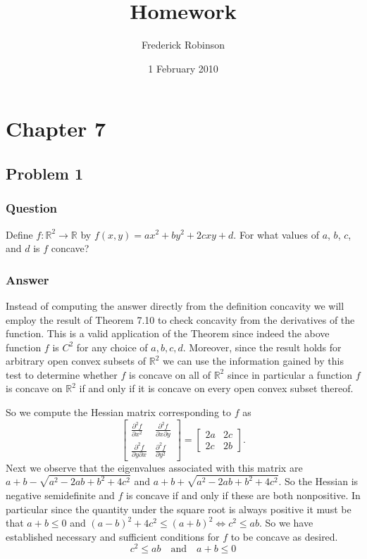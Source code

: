 \documentclass[12pt]{article}
\title{Homework}
\author{Frederick Robinson}
\date{1 February 2010}
\begin{document}

   \maketitle

\setcounter{tocdepth}{2} 

\tableofcontents

\section{Chapter 7}
\subsection{Problem 1}
\subsubsection{Question}
Define $f:\mathbb{R}^2 \to \mathbb{R}$ by $f(x,y) = a x^2 + b y^2 + 2 c x y + d$. For what values of $a$, $b$, $c$, and $d$ is $f$ concave? 
\subsubsection{Answer}
Instead of computing the answer directly from the definition concavity we will employ the result of Theorem 7.10 to check concavity from the derivatives of the function. This is a valid application of the Theorem since indeed the above function $f$ is $C^2$ for any choice of $a, b, c, d$.  Moreover, since the result holds for arbitrary open convex subsets of $\mathbb{R}^2$ we can use the information gained by this test to determine whether $f$ is concave on all of $\mathbb{R}^2$ since in particular a function $f$ is concave on $\mathbb{R}^2$ if and only if it is concave on every open convex subset thereof. 

So we compute the Hessian matrix corresponding to $f$ as 
\[\left[ \begin{array}{lr } 
\frac{\partial^2 f}{\partial x^2} & \frac{\partial^2 f}{\partial x \partial y} \\
\frac{\partial^2 f}{\partial y \partial x}&\frac{\partial^2 f}{\partial y^2}
 \end{array} \right]
 =
 \left[ \begin{array}{lr } 
2 a & 2 c \\
2 c & 2 b
 \end{array} \right]
 .\]
Next we observe that the eigenvalues associated with this matrix are $a+b-\sqrt{a^2-2 a b+b^2+4 c^2}$ and $a+b+\sqrt{a^2-2 a b+b^2+4 c^2}$. So the Hessian is negative semidefinite and $f$ is concave if and only if these are both nonpositive. In particular since the quantity under the square root is always positive it must be that $a+b \leq 0$ and $(a-b)^2+4 c^2 \leq (a+b)^2 \Leftrightarrow c^2 \leq ab$. So we have established necessary and sufficient conditions for $f$ to be concave as desired.
\[c^2\leq ab \quad \mathrm{ and} \quad a+b\leq 0\]
\end{document}
